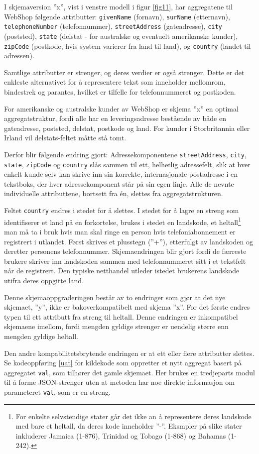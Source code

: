 I skjemaversion ''x'', vist i venstre modell i figur \ref{fig11}, har aggregatene til WebShop følgende attributter: \texttt{givenName} (fornavn), \texttt{surName} (etternavn), \texttt{telephoneNumber} (telefonnummer), \texttt{streetAddress} (gateadresse), \texttt{city} (poststed), \texttt{state} (delstat - for australske og eventuelt amerikanske kunder), \texttt{zipCode} (postkode, hvis system varierer fra land til land), og \texttt{country} (landet til adressen).

Samtlige attributter er strenger, og deres verdier er også strenger. Dette er det enkleste alternativet for å representere tekst som inneholder mellomrom, bindestrek og parantes, hvilket er tilfelle for telefonnummeret og postkoden.

For amerikanske og australske kunder av WebShop er skjema ''x'' en optimal aggregatstruktur, fordi alle har en leveringsadresse bestående av både en gateadresse, poststed, delstat, postkode og land. For kunder i Storbritannia eller Irland vil delstats-feltet måtte stå tomt.

Derfor blir følgende endring gjort: Adressekomponentene \texttt{streetAddress}, \texttt{city}, \texttt{state}, \texttt{zipCode} og \texttt{country} slås sammen til ett, helhetlig adressefelt, slik at hver enkelt kunde selv kan skrive inn sin korrekte, internasjonale postadresse i en tekstboks, der hver adressekomponent står på sin egen linje. Alle de nevnte individuelle attributtene, bortsett fra én, slettes fra aggregatstrukturen.

Feltet \texttt{country} endres i stedet for å slettes. I stedet for å lagre en streng som identifiserer et land på en forkortelse, brukes i stedet en landskode, et heltall\footnote{For enkelte selvstendige stater går det ikke an å representere deres landskode med bare et heltall, da deres kode inneholder ''-''. Eksmpler på slike stater inkluderer Jamaica (1-876), Trinidad og Tobago (1-868) og Bahamas (1-242).} man må ta i bruk hvis man skal ringe en person hvis telefoniabonnement er registrert i utlandet. Først skrives et plusstegn (''+''), etterfulgt av landskoden og deretter personens telefonnummer. Skjemaendringen blir gjort fordi de færreste brukere skriver inn landskoden sammen med telefonnummeret sitt i et tekstfelt når de registrert. Den typiske netthandel utleder istedet brukerens landskode utifra deres oppgitte land.

Denne skjemaoppgraderingen består av to endringer som gjør at det nye skjemaet, ''y'', ikke er bakoverkompatibelt med skjema ''x''. For det første endres typen til ett attributt fra streng til heltall. Denne endringen er inkompatibel skjemaene imellom, fordi mengden gyldige strenger er uendelig større enn mengden gyldige heltall.

Den andre kompabilitetsbrytende endringen er at ett eller flere attributter slettes. Se kodeoppføring \ref{uat} for kildekode som oppretter et nytt aggregat basert på aggregatet \texttt{val}, som tilhører det gamle skjemaet. Her brukes en tredjeparts modul til å forme JSON-strenger uten at metoden har noe direkte informasjon om parameteret \texttt{val}, som er en streng.

\newpage


